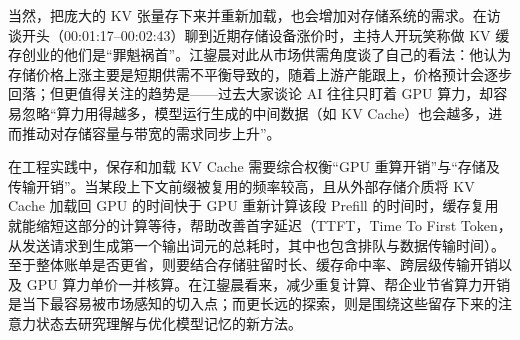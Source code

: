 \documentclass[UTF8,a4paper,11pt,fontset=fandol]{ctexart}
\begin{document}
当然，把庞大的 KV 张量存下来并重新加载，也会增加对存储系统的需求。在访谈开头（00:01:17–00:02:43）聊到近期存储设备涨价时，主持人开玩笑称做 KV 缓存创业的他们是“罪魁祸首”。江鋆晨对此从市场供需角度谈了自己的看法：他认为存储价格上涨主要是短期供需不平衡导致的，随着上游产能跟上，价格预计会逐步回落；但更值得关注的趋势是——过去大家谈论 AI 往往只盯着 GPU 算力，却容易忽略“算力用得越多，模型运行生成的中间数据（如 KV Cache）也会越多，进而推动对存储容量与带宽的需求同步上升”。

在工程实践中，保存和加载 KV Cache 需要综合权衡“GPU 重算开销”与“存储及传输开销”。当某段上下文前缀被复用的频率较高，且从外部存储介质将 KV Cache 加载回 GPU 的时间快于 GPU 重新计算该段 Prefill 的时间时，缓存复用就能缩短这部分的计算等待，帮助改善首字延迟（TTFT，Time To First Token，从发送请求到生成第一个输出词元的总耗时，其中也包含排队与数据传输时间）。至于整体账单是否更省，则要结合存储驻留时长、缓存命中率、跨层级传输开销以及 GPU 算力单价一并核算。在江鋆晨看来，减少重复计算、帮企业节省算力开销是当下最容易被市场感知的切入点；而更长远的探索，则是围绕这些留存下来的注意力状态去研究理解与优化模型记忆的新方法。
\end{document}
